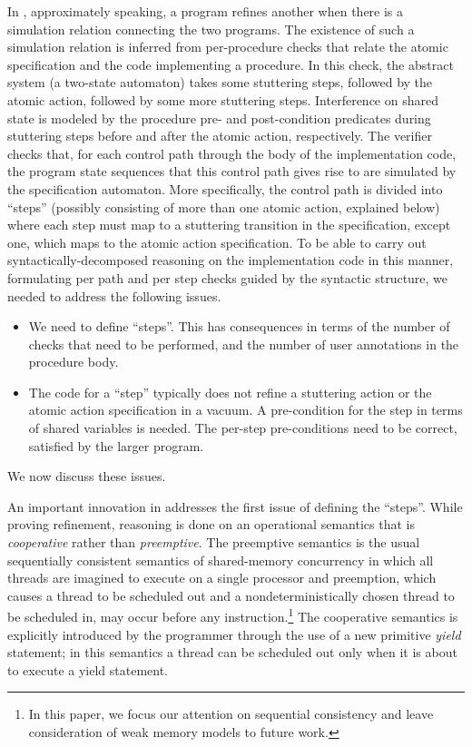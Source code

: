 In \civl, approximately speaking, a program refines another when there is a simulation relation connecting the two programs. 
The existence of such a simulation relation is inferred from per-procedure checks that relate the atomic specification and the code implementing a procedure. 
In this check, the abstract system (a two-state automaton) takes some stuttering steps, followed by the atomic action, followed by some more stuttering steps. 
Interference on shared state is modeled by the procedure pre- and post-condition predicates during stuttering steps before and after the atomic action, respectively. 
The verifier checks that, for each control path through the body of the implementation code, the program state sequences that this control path gives rise to are simulated by the specification automaton. 
More specifically, the control path is divided into ``steps'' (possibly consisting of more than one atomic action, explained below) where each step must map to a stuttering transition in the specification, except one, which maps to the atomic action specification.
To be able to carry out syntactically-decomposed reasoning on the implementation code in this manner, formulating per path and per step checks guided by the syntactic structure, we needed to address the following issues. 
\begin{itemize}
\item We need to define ``steps''. This has consequences in terms of the number of checks that need to be performed, and the number of user annotations in the procedure body.
\item The code for a ``step'' typically does not refine a stuttering action or the atomic action specification in a vacuum. A pre-condition for the step in terms of shared variables is needed. The per-step pre-conditions need to be correct, satisfied by the larger program.
\end{itemize}
We now discuss these issues. 

An important innovation in \civl addresses the first issue of defining the ``steps''. While proving refinement,
reasoning is done on an operational semantics that is {\em cooperative\/} rather than {\em preemptive\/}.
The preemptive semantics is the usual sequentially consistent semantics of shared-memory concurrency in which all threads are imagined
to execute on a single processor and preemption, which causes a thread to be scheduled out and a nondeterministically chosen thread to 
be scheduled in, may occur before any instruction.\footnote{In this paper, 
we focus our attention on sequential consistency and leave consideration of weak memory models to future work.}
The cooperative semantics is explicitly introduced by the programmer through the use of a new primitive {\em yield\/} statement;
in this semantics a thread can be scheduled out only when it is about to execute a yield statement.

